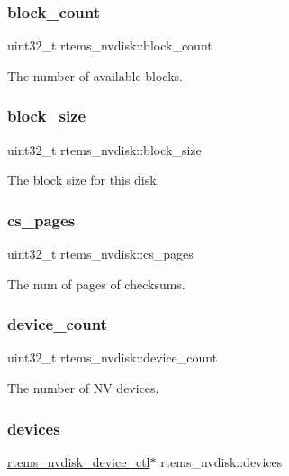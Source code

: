 \subsubsection{\texorpdfstring{block\_count}{block\_count}}
{\footnotesize\ttfamily uint32\+\_\+t rtems\+\_\+nvdisk\+::block\+\_\+count}

The number of available blocks. \mbox{\label{structrtems__nvdisk_abad00232608ae01e41ff85ff4f75ac50}} 
\subsubsection{\texorpdfstring{block\_size}{block\_size}}
{\footnotesize\ttfamily uint32\+\_\+t rtems\+\_\+nvdisk\+::block\+\_\+size}

The block size for this disk. \mbox{\label{structrtems__nvdisk_a8e4058f06f62e71b604b8778fcb91003}} 
\subsubsection{\texorpdfstring{cs\_pages}{cs\_pages}}
{\footnotesize\ttfamily uint32\+\_\+t rtems\+\_\+nvdisk\+::cs\+\_\+pages}

The num of pages of checksums. \mbox{\label{structrtems__nvdisk_a89e0877b97f3e15890c6ae12fd19bd83}} 
\subsubsection{\texorpdfstring{device\_count}{device\_count}}
{\footnotesize\ttfamily uint32\+\_\+t rtems\+\_\+nvdisk\+::device\+\_\+count}

The number of NV devices. \mbox{\label{structrtems__nvdisk_a9407f609ca924da10b14a6ec632436ac}} 
\subsubsection{\texorpdfstring{devices}{devices}}
{\footnotesize\ttfamily \mbox{\hyperlink{structrtems__nvdisk__device__ctl}{rtems\+\_\+nvdisk\+\_\+device\+\_\+ctl}}$\ast$ rtems\+\_\+nvdisk\+::devices}

